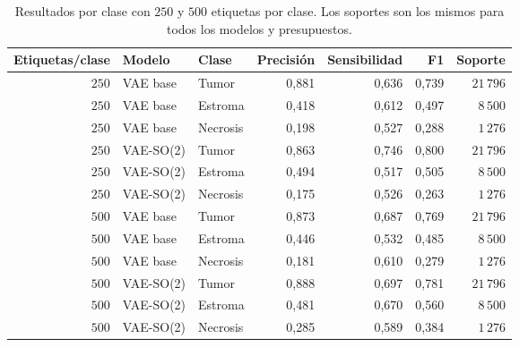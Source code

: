 \begin{table}[htbp]
    \centering
    \caption[Resultados por clase: presupuestos 250 y 500.]{Resultados por clase con \(250\) y \(500\) etiquetas por clase. Los soportes son los mismos para todos los modelos y presupuestos.}
    \label{tab:tejido-clases-250-500}
    \small
    \begin{tabular}{@{}rllrrrr@{}}
        \toprule
        Etiquetas/clase & Modelo & Clase & Precisión & Sensibilidad & F1 & Soporte \\
        \midrule
        \(250\) & VAE base & Tumor & 0,881 & 0,636 & 0,739 & \(21\,796\) \\
        \(250\) & VAE base & Estroma & 0,418 & 0,612 & 0,497 & \(8\,500\) \\
        \(250\) & VAE base & Necrosis & 0,198 & 0,527 & 0,288 & \(1\,276\) \\
        \(250\) & VAE-SO(2) & Tumor & 0,863 & 0,746 & 0,800 & \(21\,796\) \\
        \(250\) & VAE-SO(2) & Estroma & 0,494 & 0,517 & 0,505 & \(8\,500\) \\
        \(250\) & VAE-SO(2) & Necrosis & 0,175 & 0,526 & 0,263 & \(1\,276\) \\
        \(500\) & VAE base & Tumor & 0,873 & 0,687 & 0,769 & \(21\,796\) \\
        \(500\) & VAE base & Estroma & 0,446 & 0,532 & 0,485 & \(8\,500\) \\
        \(500\) & VAE base & Necrosis & 0,181 & 0,610 & 0,279 & \(1\,276\) \\
        \(500\) & VAE-SO(2) & Tumor & 0,888 & 0,697 & 0,781 & \(21\,796\) \\
        \(500\) & VAE-SO(2) & Estroma & 0,481 & 0,670 & 0,560 & \(8\,500\) \\
        \(500\) & VAE-SO(2) & Necrosis & 0,285 & 0,589 & 0,384 & \(1\,276\) \\
        \bottomrule
    \end{tabular}
\end{table}
